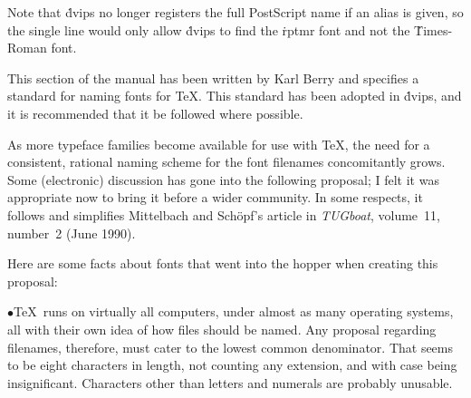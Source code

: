Note that \.{dvips} no longer registers the full PostScript name if an
alias is given, so the single line
\noindent
would only allow \.{dvips} to find the \.{rptmr} font and not the
\.{Times-Roman} font.


{\def\journal#1{{\sl #1}}
\def\table{\vbox\bgroup
\vskip\parskip\halign\bgroup\strut\indent\tt ##\hfil\quad
    &\vtop{%
       \advance\hsize by -\parindent %
       \advance\hsize by -1em        %
       \advance\hsize by -2\fontdimen7\tentt
       \rm\noindent ##}\hfil
    \cr}
\def\setuphsize{%
       \advance\hsize by -\parindent %
       \divide\hsize by 2            %
       \advance\hsize by -1.5em      %
       \advance\hsize by -2\fontdimen7\tentt}
\def\dtable{\vbox\bgroup\vskip\parskip\halign\bgroup\strut
    \indent##&\tt ##\hfil\quad
    &\vtop{\setuphsize\rm\noindent ##}\hfil&\quad\tt ##\hfil\quad
    &\vtop{\setuphsize\rm\noindent ##}\hfil\cr}
\def\endtable{%
  \egroup\egroup %
  \smallskip %
}
\def\entry#1#2{#1&#2\cr}
\def\mitem{\item{$\bullet$}}
\def\\{\hfil\break}

This section of the manual has been written by Karl Berry and
specifies a standard for naming fonts for \TeX.  This standard has
been adopted in \.{dvips}, and it is recommended that it be followed
where possible.

As more typeface families become available for use with \TeX, the need
for a consistent, rational naming scheme for the font filenames
concomitantly grows. Some (electronic) discussion has gone into the
following proposal; I felt it was appropriate now to bring it before a
wider community.  In some respects, it follows and simplifies
Mittelbach and Sch\"opf's article in \journal{TUGboat}, volume~11,
number~2 (June 1990).

Here are some facts about fonts that went into the hopper when creating
this proposal:

\mitem \TeX\ runs on virtually all computers, under almost as many operating
systems, all with their own idea of how files should be named.  Any
proposal regarding filenames, therefore, must cater to the lowest common
denominator.  That seems to be eight characters in length, not counting any
extension, and with case being insignificant.  Characters other
than letters and numerals are probably unusable.

}
